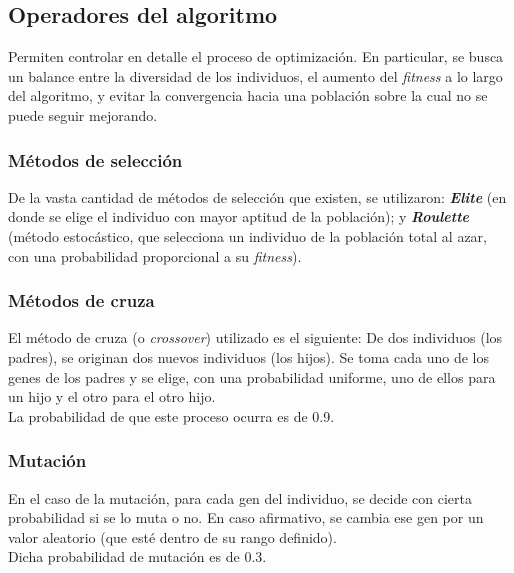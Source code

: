 \documentclass{article}
\begin{document}
\subsection{Operadores del algoritmo}
Permiten controlar en detalle el proceso de optimizaci\'on. En particular, se busca un balance entre la diversidad de los individuos, el aumento del \textit{fitness} a lo largo del algoritmo, y evitar la convergencia hacia una poblaci\'on sobre la cual no se puede seguir mejorando.
\subsubsection{M\'etodos de selecci\'on}
\label{metodos de seleccion}
De la vasta cantidad de m\'etodos de selecci\'on que existen, se utilizaron: \textbf{\textit{Elite}} (en donde se elige el individuo con mayor aptitud de la poblaci\'on); y \textbf{\textit{Roulette}} (m\'etodo estoc\'astico, que selecciona un individuo de la poblaci\'on total al azar, con una probabilidad proporcional a su \textit{fitness}).

\subsubsection{M\'etodos de cruza}
\label{metodos de cruza}
El m\'etodo de cruza (o \textit{crossover}) utilizado es el siguiente: De dos individuos (los padres), se originan dos nuevos individuos (los hijos). Se toma cada uno de los genes de los padres y se elige, con una probabilidad uniforme, uno de ellos para un hijo y el otro para el otro hijo.\\
La probabilidad de que este proceso ocurra es de 0.9.


\subsubsection{Mutaci\'on}
\label{mutacion}
En el caso de la mutaci\'on, para cada gen del individuo, se decide con cierta probabilidad si se lo muta o no. En caso afirmativo, se cambia ese gen por un valor aleatorio (que est\'e dentro de su rango definido).\\
Dicha probabilidad de mutaci\'on es de 0.3.
\end{document}

